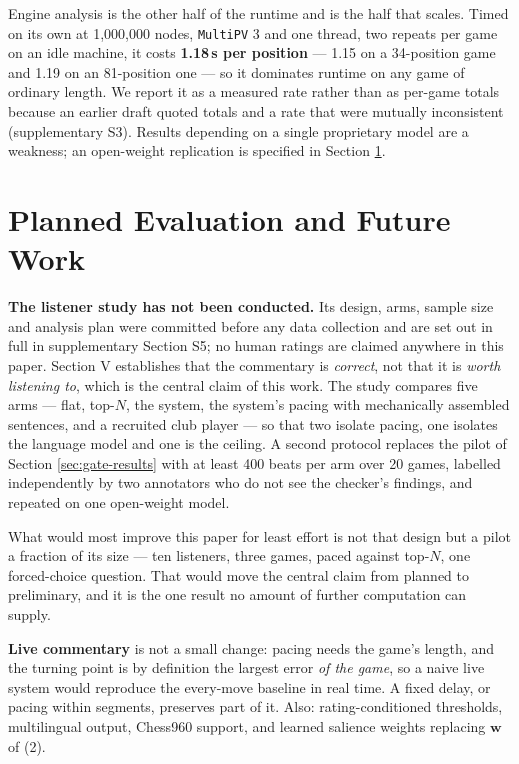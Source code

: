 \documentclass[conference]{IEEEtran}
\begin{document}
Engine analysis is the other half of the runtime and is the half that
scales. Timed on its own at 1,000,000 nodes, \texttt{MultiPV} 3 and one
thread, two repeats per game on an idle machine, it costs \textbf{1.18\,s
per position} --- 1.15 on a 34-position game and 1.19 on an 81-position one
--- so it dominates runtime on any game of ordinary length. We report it as
a measured rate rather than as per-game totals because an earlier draft
quoted totals and a rate that were mutually inconsistent (supplementary S3).
Results depending on a single proprietary model are a weakness; an
open-weight replication is specified in Section \ref{sec:planned}.

\section{Planned Evaluation and Future Work}
\label{sec:planned}

\textbf{The listener study has not been conducted.} Its design, arms, sample
size and analysis plan were committed before any data collection and are set
out in full in supplementary Section S5; no human ratings are claimed
anywhere in this paper. Section V establishes that the commentary is
\emph{correct}, not that it is \emph{worth listening to}, which is the
central claim of this work. The study compares five arms --- flat, top-$N$,
the system, the system's pacing with mechanically assembled sentences, and a
recruited club player --- so that two isolate pacing, one isolates the
language model and one is the ceiling. A second protocol replaces the pilot
of Section \ref{sec:gate-results} with at least 400 beats per arm over 20
games, labelled independently by two annotators who do not see the checker's
findings, and repeated on one open-weight model.

What would most improve this paper for least effort is not that design but a
pilot a fraction of its size --- ten listeners, three games, paced against
top-$N$, one forced-choice question. That would move the central claim from
planned to preliminary, and it is the one result no amount of further
computation can supply.

\textbf{Live commentary} is not a small change: pacing needs the game's
length, and the turning point is by definition the largest error \emph{of
the game}, so a naive live system would reproduce the every-move baseline in
real time. A fixed delay, or pacing within segments, preserves part of it.
Also: rating-conditioned thresholds, multilingual output, Chess960 support,
and learned salience weights replacing $\mathbf{w}$ of (2).
\end{document}
